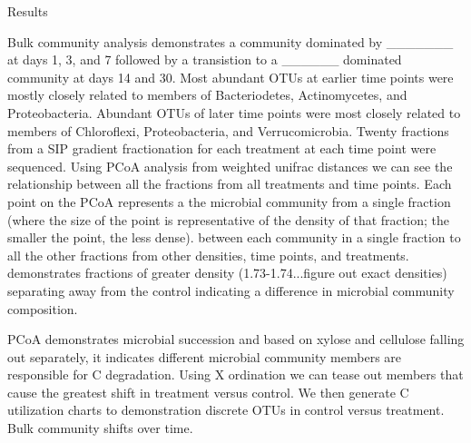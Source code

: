 {Results}


Bulk community analysis demonstrates a community dominated by _______ at days 1, 3, and 7 followed by a transistion to a ______ dominated community at days 14 and 30. Most abundant OTUs at earlier time points were mostly closely related to members of Bacteriodetes, Actinomycetes, and Proteobacteria.  Abundant OTUs of later time points were most closely related to members of Chloroflexi, Proteobacteria, and Verrucomicrobia.  Twenty fractions from a SIP gradient fractionation for each treatment at each time point were sequenced.  Using PCoA analysis from weighted unifrac distances we can see the relationship between all the fractions from all treatments and time points.  Each point on the PCoA represents a the microbial community from a single fraction (where the size of the point is representative of the density of that fraction; the smaller the point, the less dense).   
between each community in a single fraction to all the other fractions from other densities, time points, and treatments.  
demonstrates fractions of greater density (1.73-1.74...figure out exact densities) separating away from the control indicating a difference in microbial community composition.          

PCoA demonstrates microbial succession and based on xylose and cellulose falling out separately, it indicates different microbial community members are responsible for C degradation.  Using X ordination we can tease out members that cause the greatest shift in treatment versus control.  We then generate C utilization charts to demonstration discrete OTUs in control versus treatment.  Bulk community shifts over time.  